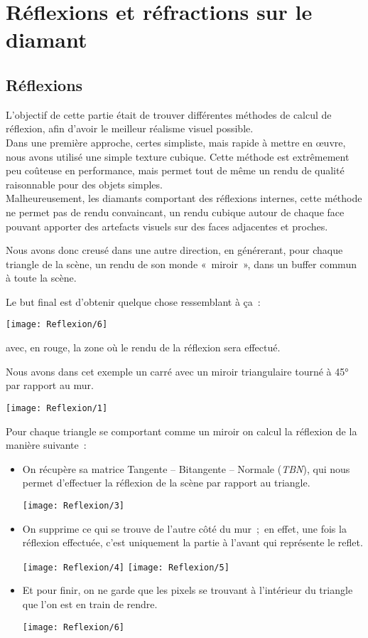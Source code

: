 \section{Réflexions et réfractions sur le diamant}

\subsection{Réflexions}

L'objectif de cette partie était de trouver  différentes méthodes
de calcul de réflexion, afin d'avoir le meilleur réalisme visuel possible. \\

Dans une première approche, certes simpliste, mais rapide à mettre en œuvre,
nous avons utilisé une simple texture cubique. Cette méthode est extrêmement peu
coûteuse en performance, mais permet tout de même un rendu de qualité raisonnable
pour des objets simples. \\
Malheureusement, les diamants comportant des réflexions internes, cette méthode ne permet pas
de rendu convaincant, un rendu cubique autour de chaque face pouvant apporter des artefacts
visuels sur des faces adjacentes et proches.

Nous avons donc creusé dans une autre direction, en générerant, pour chaque triangle de la scène,
un rendu de son monde «~miroir~», dans un buffer commun à toute la scène.

Le but final est d'obtenir quelque chose ressemblant à ça~:

\texttt{[image: Reflexion/6]}

avec, en rouge, la zone où le rendu de la réflexion sera effectué.

Nous avons dans cet exemple un carré avec un miroir triangulaire tourné à 45°
par rapport au mur.

\texttt{[image: Reflexion/1]}

Pour chaque triangle se comportant comme un miroir on calcul la réflexion de la manière suivante~:

\begin{itemize}
    \item On récupère sa matrice Tangente – Bitangente – Normale (\textit{TBN}), qui nous permet
        d'effectuer la réflexion de la scène par rapport au triangle.

        \texttt{[image: Reflexion/3]}

    \item On supprime ce qui se trouve de l'autre côté du mur ; en effet, une
        fois la réflexion effectuée, c'est uniquement la partie à l'avant qui
        représente le reflet.

        \texttt{[image: Reflexion/4]}
        \texttt{[image: Reflexion/5]}
    \item Et pour finir, on ne garde que les pixels se trouvant à l'intérieur
        du triangle que l'on est en train de rendre.

        \texttt{[image: Reflexion/6]}
\end{itemize}

